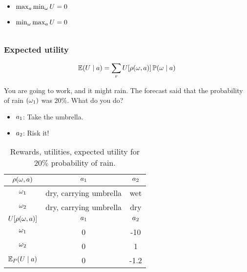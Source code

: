 \begin{frame}
\begin{example}
\begin{columns}
\begin{column}{0.5\textwidth}
        \begin{itemize}
        \item<2-> $\max_a \min_\omega U = 0$
        \item<3-> $\min_\omega \max_a U = 0$
        \end{itemize}
      \end{column}

    \end{columns}
  \end{example}
\end{frame}



\begin{frame}
  \frametitle{Expected utility}
  \[
  \mathop{\mbox{\ensuremath{\mathbb{E}}}}\nolimits (U \mid a) = \sum_r U[\rho(\omega, a)] \mathop{\mbox{\ensuremath{\mathbb{P}}}}\nolimits(\omega \mid a)
  \]
  \begin{example}%
    You are going to work, and it might rain. The forecast said that
    the probability of rain $(\omega_1)$ was $20\%$. What do you do?
    \begin{itemize}
    \item $a_1$: Take the umbrella.
    \item $a_2$: Risk it!
    \end{itemize}
    \begin{table}
      \centering
      \begin{tabular}{c|c|c}
        $\rho(\omega,a)$ & $a_1$ & $a_2$ \\ %
        \hline
        $\omega_1$ & dry, carrying umbrella & wet\\
        $\omega_2$ & dry, carrying umbrella & dry\\
        \hline
        \hline
        $U[\rho(\omega,a)]$ & $a_1$ & $a_2$ \\
        \hline
        $\omega_1$ & 0 & -10\\
        $\omega_2$ & 0 & 1\\
        \hline
        \hline
        $\mathop{\mbox{\ensuremath{\mathbb{E}}}}\nolimits_P(U \mid a)$ & 0 &  -1.2 \\ 
      \end{tabular}
      \caption{Rewards, utilities, expected utility for $20\%$ probability of rain.}
      \label{tab:rain-utility-function}
    \end{table}
  \end{example}
\end{frame}





